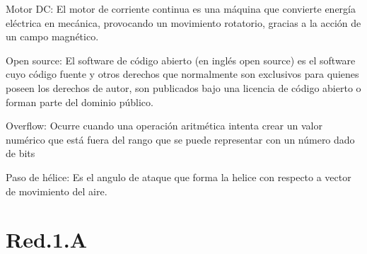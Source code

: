 \documentclass{iccmemoria}
\begin{document}
\begin{glosario}
	\item[Motor DC:] El motor de corriente continua es una máquina que convierte energía eléctrica en mecánica, provocando un movimiento rotatorio, gracias a la acción de un campo magnético.
	\item[Open source:] El software de código abierto (en inglés open source) es el software cuyo código fuente y otros derechos que normalmente son exclusivos para quienes poseen los derechos de autor, son publicados bajo una licencia de código abierto o forman parte del dominio público.
	\item[Overflow:] Ocurre cuando una operación aritmética intenta crear un valor numérico que está fuera del rango que se puede representar con un número dado de bits
	\item[Paso de hélice:] Es el angulo de ataque que forma la helice con respecto a vector de movimiento del aire.
\end{glosario}





\appendixpart

\label{appendix:entrenamiento red}

\section{Red.1.A}
\end{document}
